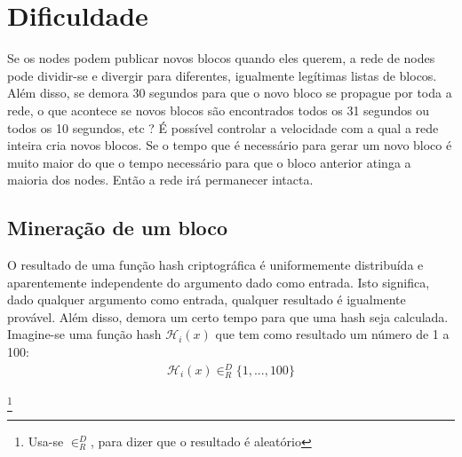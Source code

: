 \section{Dificuldade}
\label{sec:difficulty}

Se os nodes podem publicar novos blocos quando eles querem, a rede de nodes pode dividir-se e divergir para diferentes, igualmente legítimas listas de blocos. Além disso, se demora 30 segundos para que o novo bloco se propague por toda a rede, o que acontece se novos blocos são encontrados todos os 31 segundos ou todos os 10 segundos, etc ?
É possível controlar a velocidade com a qual a rede inteira cria novos blocos. Se o tempo que é necessário para gerar um novo bloco é muito maior do que o tempo necessário para que o bloco anterior atinga a maioria dos nodes. Então a rede irá permanecer intacta.
\subsection{Mineração de um bloco}
O resultado de uma função hash criptográfica é uniformemente distribuída e aparentemente independente do argumento dado como entrada. Isto significa, dado qualquer argumento como entrada, qualquer resultado é igualmente provável. Além disso, demora um certo tempo para que uma hash seja calculada.
Imagine-se uma função hash $\mathcal{H}_i(x)$ que tem como resultado um número de 1 a 100:
\begin{align*}
\mathcal{H}_i(x) \in^D_R \{1,...,100\}
\end{align*}

\footnote{Usa-se $\in^D_R$, para dizer que o resultado é aleatório} 


